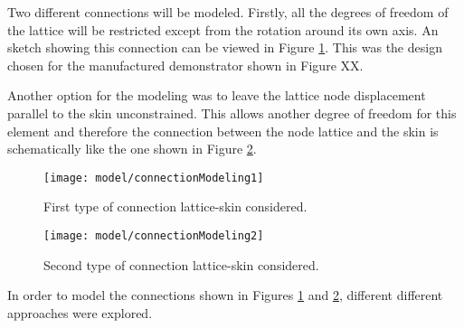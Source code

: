 
Two different connections will be modeled. Firstly, all the degrees of freedom of the lattice will be restricted except from the rotation around its own axis. An sketch showing this connection can be viewed in Figure \ref{fig:connectionModeling1}. This was the design chosen for the manufactured demonstrator shown in Figure XX.

Another option for the modeling was to leave the lattice node displacement parallel to the skin unconstrained. This allows another degree of freedom for this element and therefore the connection between the node lattice and the skin is schematically like the one shown in Figure \ref{fig:connectionModeling2}.

\begin{figure}[!htpb]
  \centering
  \texttt{[image: model/connectionModeling1]}
  \caption[First type of connection lattice-skin considered]{First type of connection lattice-skin considered. }\label{fig:connectionModeling1}
\end{figure}

\begin{figure}[!htpb]
  \centering
  \texttt{[image: model/connectionModeling2]}
  \caption[Second type of connection lattice-skin considered]{Second type of connection lattice-skin considered. }\label{fig:connectionModeling2}
\end{figure}

In order to model the connections shown in Figures \ref{fig:connectionModeling1} and \ref{fig:connectionModeling2}, different different approaches were explored. 

\subsubsection{}